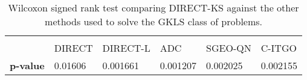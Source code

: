 \begin{table*}[h]
    \tiny
    \begin{center}
    
    \begin{tabular}{ P{1.0cm} P{1.0cm} P{1.2cm} P{1.0cm} P{1.0cm} P{1.0cm} }
                     &         &          &          &          &        \\[2em]
                     &  DIRECT & DIRECT-L &    ADC   &    SGEO-QN   & C-ITGO \\[1em]
    \rule{0pt}{3ex}
    \textbf{p-value} & 0.01606 & 0.001661 & 0.001207 & 0.002025 & 0.002155 \\


    \end{tabular}
    \end{center}
    \vspace*{-4mm}
    \captionsetup{justification=centering}
    \caption{Wilcoxon signed rank test comparing DIRECT-KS against the other methods used to solve the GKLS class of problems. \\[2em]}
    \label{tab:Wilcoxon2}
\end{table*}